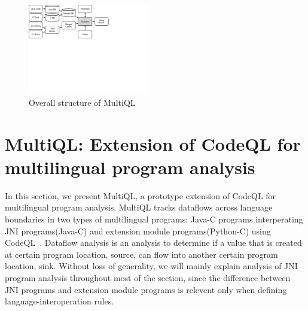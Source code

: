 \begin{figure}[t]
  \centering
  \vspace{2mm}
  \includegraphics[width=0.47\textwidth]{img/codeql.pdf}
  \caption{Overall structure of MultiQL}
  \label{fig:codeql}
\end{figure}

\section{MultiQL: Extension of CodeQL for multilingual program analysis}\label{sec:impl}
In this section, we present MultiQL, a prototype extension of CodeQL for
multilingual program analysis. 
MultiQL tracks dataflows across language boundaries in two types of
multilingual programs: Java-C programs interperating JNI programs(Java-C)
and extension module programs(Python-C) using CodeQL~\cite{codeql}.
Dataflow analysis is an analysis to determine if a value that is created at
certain program location, source, can flow into another certain program location, sink.
Without loss of generality, we will mainly explain analysis of JNI program
analysis throughout most of the section, since the difference between JNI programs and
extension module programs is relevent only when defining
language-interoperation rules.




